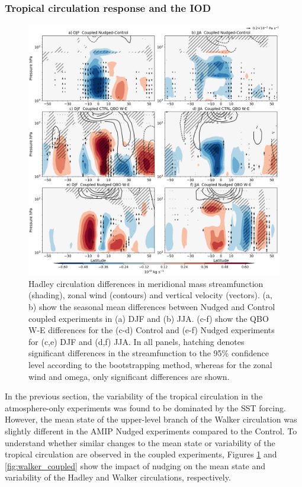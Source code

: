 \subsubsection{Tropical circulation response and the IOD}

\begin{figure}[t!]
\centering
 \includegraphics[width=\linewidth]{figures/suite_coupledhadley.png}
\caption[Hadley circulation in coupled nudged experiments.]{Hadley circulation differences in meridional mass streamfunction (shading), zonal wind (contours) and vertical velocity (vectors). (a, b) show the seasonal mean differences between Nudged and Control coupled experiments in (a) DJF and (b) JJA. (c-f) show the QBO W-E differences for the (c-d) Control and (e-f) Nudged experiments for (c,e) DJF and (d,f) JJA. In all panels, hatching denotes significant differences in the streamfunction to the 95\% confidence level according to the bootstrapping method, whereas for the zonal wind and omega, only significant differences are shown.}
\label{fig:hadley_coupled}
\end{figure}

In the previous section, the variability of the tropical circulation in the atmosphere-only experiments was found to be dominated by the SST forcing. However, the mean state of the upper-level branch of the Walker circulation was slightly different in the AMIP Nudged experiments compared to the Control. 
To understand whether similar changes to the mean state or variability of the tropical circulation are observed in the coupled experiments, Figures \ref{fig:hadley_coupled} and \ref{fig:walker_coupled} show the impact of nudging on the mean state and variability of the Hadley and Walker circulations, respectively.

